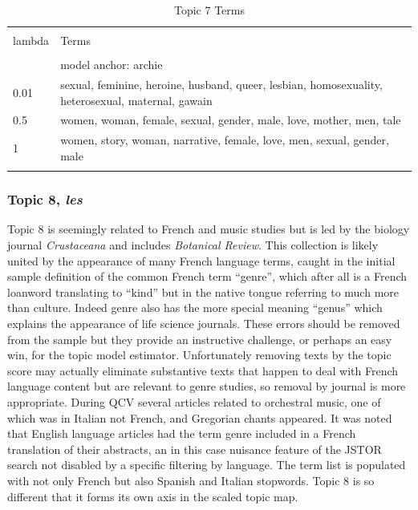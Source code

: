 \documentclass[]{book}
\theoremstyle{definition}
\theoremstyle{definition}
\theoremstyle{definition}
\theoremstyle{remark}
\begin{document}
\begin{table}[!htbp] \centering 
  \caption{Topic 7 Terms} 
  \label{tab:t7d} 
\begin{tabularx}{\textwidth}{@{\extracolsep{5pt}} lY} 
\\[-1.8ex]\hline 
\hline \\[-1.8ex] 
lambda & Terms \\ 
\hline \\[-1.8ex] 
 & model anchor: archie \\ 
0.01 & sexual, feminine, heroine, husband, queer, lesbian, homosexuality, heterosexual, maternal, gawain \\ 
0.5 & women, woman, female, sexual, gender, male, love, mother, men, tale \\ 
1 & women, story, woman, narrative, female, love, men, sexual, gender, male \\ 
\hline \\[-1.8ex] 
\end{tabularx} 
\end{table}

\hypertarget{topic-8-les}{%
\subsubsection{\texorpdfstring{Topic 8,
\emph{les}}{Topic 8, les}}\label{topic-8-les}}

Topic 8 is seemingly related to French and music studies but is led by
the biology journal \emph{Crustaceana} and includes \emph{Botanical
Review}. This collection is likely united by the appearance of many
French language terms, caught in the initial sample definition of the
common French term ``genre'', which after all is a French loanword
translating to ``kind'' but in the native tongue referring to much more
than culture. Indeed genre also has the more special meaning ``genus''
which explains the appearance of life science journals. These errors
should be removed from the sample but they provide an instructive
challenge, or perhaps an easy win, for the topic model estimator.
Unfortunately removing texts by the topic score may actually eliminate
substantive texts that happen to deal with French language content but
are relevant to genre studies, so removal by journal is more
appropriate. During QCV several articles related to orchestral music,
one of which was in Italian not French, and Gregorian chants appeared.
It was noted that English language articles had the term genre included
in a French translation of their abstracts, an in this case nuisance
feature of the JSTOR search not disabled by a specific filtering by
language. The term list is populated with not only French but also
Spanish and Italian stopwords. Topic 8 is so different that it forms its
own axis in the scaled topic map.
\end{document}
